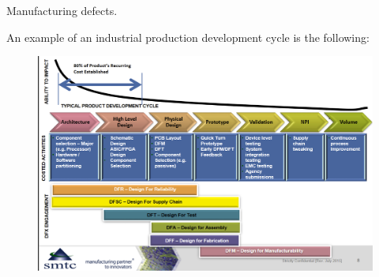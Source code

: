 \documentclass[12pt]{article}
\begin{document}
Manufacturing defects.

An example of an industrial production development cycle is the following:

\begin{figure}[h!]
	\centering
	\includegraphics[keepaspectratio, width = \textwidth]{assets/production_cycle.png}
\end{figure}
\end{document}
